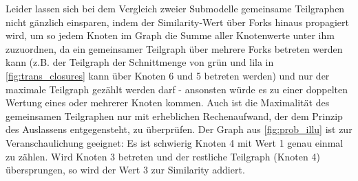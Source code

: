 Leider lassen sich bei dem Vergleich zweier Submodelle gemeinsame Teilgraphen nicht gänzlich einsparen, indem der Similarity-Wert über Forks hinaus propagiert wird, um so jedem Knoten im Graph die Summe aller Knotenwerte unter ihm zuzuordnen, da ein gemeinsamer Teilgraph über mehrere Forks betreten werden kann (z.B. der Teilgraph der Schnittmenge von grün und lila in \autoref{fig:trans_closures} kann über Knoten 6 und 5 betreten werden) und nur der maximale Teilgraph gezählt werden darf - ansonsten würde es zu einer doppelten Wertung eines oder mehrerer Knoten kommen. Auch ist die Maximalität  des gemeinsamen Teilgraphen nur mit erheblichen Rechenaufwand, der dem Prinzip des Auslassens entgegensteht, zu überprüfen. Der Graph aus \autoref{fig:prob_illu} ist zur Veranschaulichung geeignet: Es ist schwierig Knoten 4 mit Wert 1 genau einmal zu zählen. Wird Knoten 3 betreten und der restliche Teilgraph (Knoten 4) übersprungen, so wird der Wert 3 zur Similarity addiert.
